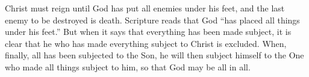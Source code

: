 \lettrine[lines=3]{C}{}hrist must reign until God has put all enemies under his feet, and the last enemy to be destroyed is death. Scripture reads that God “has placed all things under his feet.” But when it says that everything has been made subject, it is clear that he who has made everything subject to Christ is excluded. When, finally, all has been subjected to the Son, he will then subject himself to the One who made all things subject to him, so that God may be all in all.
